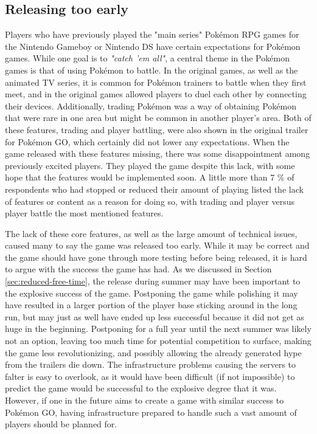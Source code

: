 
\subsection{Releasing too early}
Players who have previously played the "main series" Pokémon RPG games for the Nintendo Gameboy or Nintendo DS have certain expectations for Pokémon games. While one goal is to \emph{"catch 'em all"}, a central theme in the Pokémon games is that of using Pokémon to battle. In the original games, as well as the animated TV series, it is common for Pokémon trainers to battle when they first meet, and in the original games allowed players to duel each other by connecting their devices. Additionally, trading Pokémon was a way of obtaining Pokémon that were rare in one area but might be common in another player's area. Both of these features, trading and player battling, were also shown in the original trailer for Pokémon GO, which certainly did not lower any expectations. When the game released with these features missing, there was some disappointment among previously excited players. They played the game despite this lack, with some hope that the features would be implemented soon. A little more than 7 \% of respondents who had stopped or reduced their amount of playing listed the lack of features or content as a reason for doing so, with trading and player versus player battle the most mentioned features.

The lack of these core features, as well as the large amount of technical issues, caused many to say the game was released too early. While it may be correct and the game should have gone through more testing before being released, it is hard to argue with the success the game has had. As we discussed in Section \ref{sec:reduced-free-time}, the release during summer may have been important to the explosive success of the game. Postponing the game while polishing it may have resulted in a larger portion of the player base sticking around in the long run, but may just as well have ended up less successful because it did not get as huge in the beginning. Postponing for a full year until the next summer was likely not an option, leaving too much time for potential competition to surface, making the game less revolutionizing, and possibly allowing the already generated hype from the trailers die down. The infrastructure problems causing the servers to falter is easy to overlook, as it would have been difficult (if not impossible) to predict the game would be successful to the explosive degree that it was. However, if one in the future aims to create a game with similar success to Pokémon GO, having infrastructure prepared to handle such a vast amount of players should be planned for.

